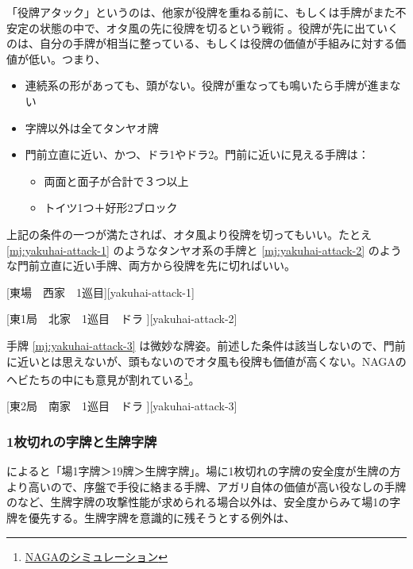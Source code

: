 \documentclass[../nankiru_main.tex]{subfiles}
\begin{document}
「役牌アタック」というのは、他家が役牌を重ねる前に、もしくは手牌がまた不安定の状態の中で、オタ風の先に役牌を切るという戦術 \citep[][pp.~16--17]{zero-teyaku}。役牌が先に出ていくのは、自分の手牌が相当に整っている、もしくは役牌の価値が手組みに対する価値が低い。つまり、

\begin{itemize}
  \item 連続系の形があっても、頭がない。役牌が重なっても鳴いたら手牌が進まない
  \item 字牌以外は全てタンヤオ牌
  \item 門前立直に近い、かつ、ドラ1やドラ2。門前に近いに見える手牌は：
  \begin{itemize}
    \item 両面と面子が合計で３つ以上 \citep[][p.~17]{zero-teyaku}
    \item トイツ1つ＋好形2ブロック \citep{senba-yakuhai}
  \end{itemize}
\end{itemize}

上記の条件の一つが満たされば、オタ風より役牌を切ってもいい。たとえ \ref{mj:yakuhai-attack-1} のようなタンヤオ系の手牌と \ref{mj:yakuhai-attack-2} のような門前立直に近い手牌、両方から役牌を先に切ればいい。

[東場　西家　1巡目][yakuhai-attack-1]

[東1局　北家　1巡目　ドラ ][yakuhai-attack-2]

手牌 \ref{mj:yakuhai-attack-3} は微妙な牌姿。前述した条件は該当しないので、門前に近いとは思えないが、頭もないのでオタ風も役牌も価値が高くない。NAGAのヘビたちの中にも意見が割れている\footnote{\href{https://naga.dmv.nico/htmls/b1ce439d70b8dfc48152e539f75e29d57763308a9de1dfafc95f65a9529f2757v2_2.html?tw=2}{NAGAのシミュレーション}}。

[東2局　南家　1巡目　ドラ ][yakuhai-attack-3]


\subsubsection*{1枚切れの字牌と生牌字牌}

\citet[p.~200]{suphx}によると「場1字牌＞19牌＞生牌字牌」。場に1枚切れの字牌の安全度が生牌の方より高いので、序盤で手役に絡まる手牌、アガリ自体の価値が高い役なしの手牌のなど、生牌字牌の攻撃性能が求められる場合以外は、安全度からみて場1の字牌を優先する。生牌字牌を意識的に残そうとする例外は、
\end{document}
